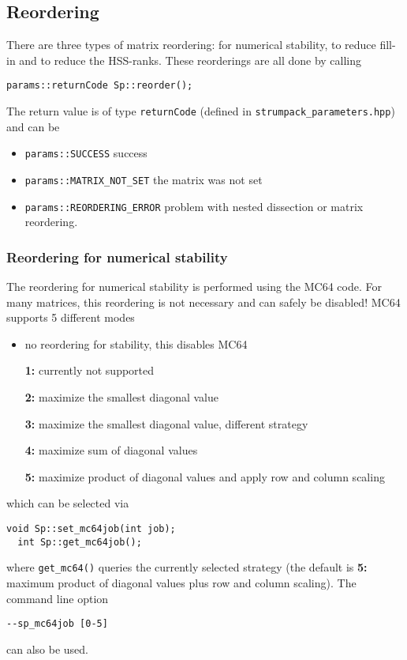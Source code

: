 \documentclass{article}
\begin{document}
\subsection{Reordering}
There are three types of matrix reordering: for numerical stability,
to reduce fill-in and to reduce the HSS-ranks. These reorderings are
all done by calling
\begin{lstlisting}[style=C]
  params::returnCode Sp::reorder();
\end{lstlisting}
The return value is of type \lstinline[style=C]!returnCode!  (defined
in \lstinline[style=Bash]!strumpack_parameters.hpp!) and can be
{\small \begin{itemize}
\item \lstinline[style=C]!params::SUCCESS! success
\item \lstinline[style=C]!params::MATRIX_NOT_SET! the matrix was not set
\item \lstinline[style=C]!params::REORDERING_ERROR! problem with nested dissection or matrix reordering.
\end{itemize}}

\subsubsection{Reordering for numerical stability}\label{sec::mc64}
The reordering for numerical stability is performed using the MC64
code. For many matrices, this reordering is not necessary and can
safely be disabled! MC64 supports 5 different modes
{\small \begin{itemize}
\item[\textbf{0:}] no reordering for stability, this disables MC64
\item[\textbf{1:}] currently not supported
\item[\textbf{2:}] maximize the smallest diagonal value
\item[\textbf{3:}] maximize the smallest diagonal value, different strategy
\item[\textbf{4:}] maximize sum of diagonal values
\item[\textbf{5:}] maximize product of diagonal values and apply row and column scaling
\end{itemize}}
which can be selected via
\begin{lstlisting}[style=C]
  void Sp::set_mc64job(int job);
  int Sp::get_mc64job();
\end{lstlisting}
where \lstinline[style=C]!get_mc64()! queries the currently selected
strategy (the default is \textbf{5:} maximum product of diagonal
values plus row and column scaling). The command line option
\begin{lstlisting}[style=Bash]
  --sp_mc64job [0-5]
\end{lstlisting}
can also be used.
\end{document}

